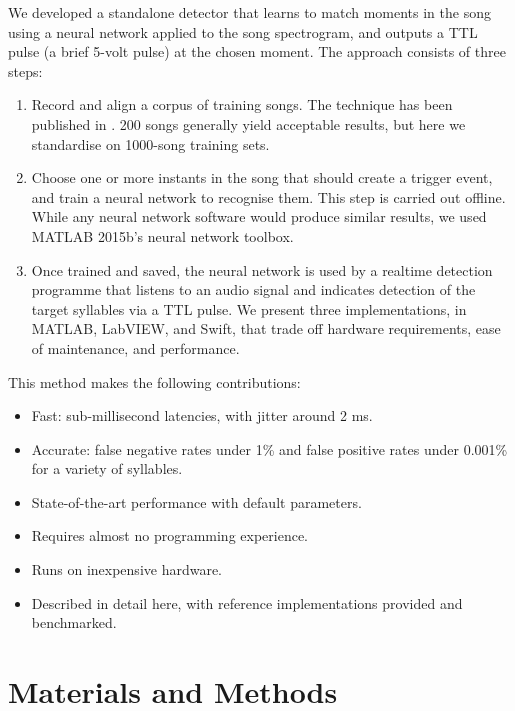\documentclass[10pt,letterpaper]{article}
\begin{document}
We developed a standalone detector that learns to match moments in the
song using a neural network applied to the song spectrogram, and
outputs a TTL pulse (a brief 5-volt pulse) at the chosen moment. The
approach consists of three steps:

\begin{enumerate}
\item Record and align a corpus of training songs.  The technique has been published in \cite{Poole2012}. 200 songs generally yield acceptable results, but here we standardise on 1000-song training sets.
\item Choose one or more instants in the song that should create a trigger event, and train a
  neural network to recognise them. This step is carried out offline.  While any neural network software would produce similar results, we used MATLAB 2015b's neural network toolbox.
\item Once trained and saved, the neural network is used by a realtime
  detection programme that listens to an audio signal and indicates detection of the target
  syllables via a TTL pulse.  We present three implementations, in MATLAB, LabVIEW, and Swift, that trade off hardware requirements, ease of maintenance, and performance.
\end{enumerate}
This method makes the following contributions:
\begin{itemize}
\item Fast: sub-millisecond latencies, with jitter around 2 ms.
\item Accurate: false negative rates under 1\% and false positive rates under 0.001\% for a variety of syllables.
\item State-of-the-art performance with default parameters.
\item Requires almost no programming experience.
\item Runs on inexpensive hardware.
\item Described in detail here, with reference implementations provided and benchmarked.
\end{itemize}



\section{Materials and Methods}
\label{sec:method}
\end{document}
